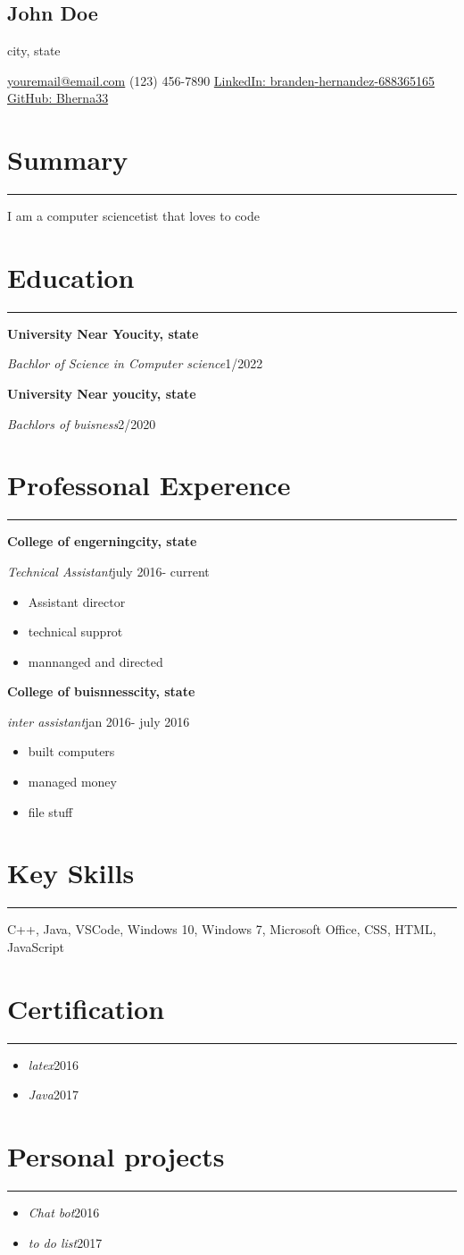 \documentclass[11pt]{article}%
\newcommand{\resumesection}[1]{\vspace{-0.5cm}\section*{\color{highlight}#1}\vspace{-0.2cm}\hrule\vspace{0.2cm}}%
\newcommand{\location}[1]{\begin{center}\vspace{-0.1cm}#1\vspace{-0.3cm}\end{center}}%
\newcommand{\contactInfo}[1]{\begin{center}\vspace{-0.1cm}#1\vspace{-0.3cm}\end{center}}%
\newcommand{\name}[1]{\begin{center}\section*{\LARGE \color{highlight}#1}\vspace{-0.8cm}\end{center}}%
\begin{document}
%
\normalsize%
\name{John Doe}%
\location{city, state}%
\contactInfo{\href{mailto:email@domain}{youremail@email.com}{ (123) 456{-}7890 }{\href{https://www.linkedin.com/in/branden{-}hernandez{-}688365165/}{LinkedIn: branden{-}hernandez{-}688365165}}{\href{https://github.com/Bherna33}{ GitHub: Bherna33}}}%
\resumesection{Summary}%
I am a computer sciencetist that loves to code%
\resumesection{Education}%
\textbf{University Near You}{\textbf{\hfill {city, state}}}%
\par%
\textit{Bachlor of Science in Computer science}{\hfill {1/2022}}%
\par%
\textbf{University Near you}{\textbf{\hfill {city, state}}}%
\par%
\textit{Bachlors of buisness}{\hfill {2/2020}}%
\par%
\resumesection{Professonal Experence}%
\textbf{College of engerning}{\textbf{\hfill{city, state}}}%
\par%
\textit{Technical Assistant}{\hfill{july 2016{-} current}}%
\begin{itemize}%
\item%
Assistant director%
\item%
technical supprot%
\item%
mannanged and directed%
\end{itemize}%
\textbf{College of buisnness}{\textbf{\hfill{city, state}}}%
\par%
\textit{inter assistant}{\hfill{jan 2016{-} july 2016}}%
\begin{itemize}%
\item%
built computers%
\item%
managed money%
\item%
file stuff%
\end{itemize}%
\resumesection{Key Skills}%
C++, Java, VSCode, Windows 10, Windows 7, Microsoft Office, CSS, HTML, JavaScript%
\resumesection{Certification}%
\begin{itemize}%
\item%
\textit{latex}{\hfill{2016}}%
\item%
\textit{Java}{\hfill{2017}}%
\end{itemize}%
\resumesection{Personal projects}%
\begin{itemize}%
\item%
\textit{Chat bot}{\hfill{2016}}%
\item%
\textit{to do list}{\hfill{2017}}%
\end{itemize}%
\end{document}
